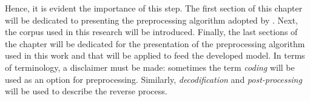 
Hence, it is evident the importance of this step. The first section of this chapter will be dedicated to presenting the preprocessing algorithm adopted by \cite{rumelhart:1986}. Next, the corpus used in this research will be introduced. Finally, the last sections of the chapter will be dedicated for the presentation of the preprocessing algorithm used in this work and that will be applied to feed the developed model. In terms of terminology, a disclaimer must be made: sometimes the term \textit{coding} will be used as an option for preprocessing. Similarly, \textit{decodification} and \textit {post-processing} will be used to describe the reverse process.


